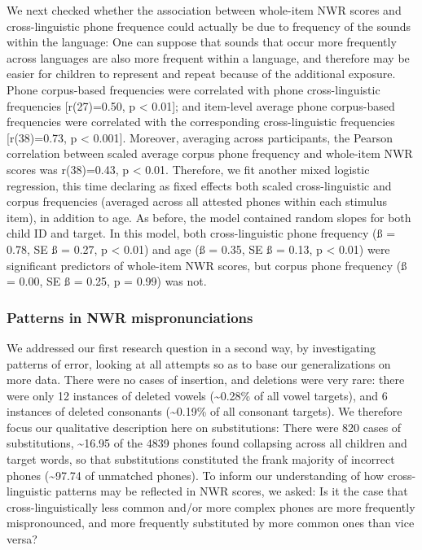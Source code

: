 \documentclass[english,,man,floatsintext]{apa6}
\begin{document}
We next checked whether the association between whole-item NWR scores and cross-linguistic phone frequence could actually be due to frequency of the sounds within the language: One can suppose that sounds that occur more frequently across languages are also more frequent within a language, and therefore may be easier for children to represent and repeat because of the additional exposure. Phone corpus-based frequencies were correlated with phone cross-linguistic frequencies {[}r(27)=0.50, p \textless{} 0.01{]}; and item-level average phone corpus-based frequencies were correlated with the corresponding cross-linguistic frequencies {[}r(38)=0.73, p \textless{} 0.001{]}. Moreover, averaging across participants, the Pearson correlation between scaled average corpus phone frequency and whole-item NWR scores was r(38)=0.43, p \textless{} 0.01. Therefore, we fit another mixed logistic regression, this time declaring as fixed effects both scaled cross-linguistic and corpus frequencies (averaged across all attested phones within each stimulus item), in addition to age. As before, the model contained random slopes for both child ID and target. In this model, both cross-linguistic phone frequency (ß = 0.78, SE ß = 0.27, p \textless{} 0.01) and age (ß = 0.35, SE ß = 0.13, p \textless{} 0.01) were significant predictors of whole-item NWR scores, but corpus phone frequency (ß = 0.00, SE ß = 0.25, p = 0.99) was not.

\hypertarget{patterns-in-nwr-mispronunciations}{%
\subsubsection{Patterns in NWR mispronunciations}\label{patterns-in-nwr-mispronunciations}}

We addressed our first research question in a second way, by investigating patterns of error, looking at all attempts so as to base our generalizations on more data. There were no cases of insertion, and deletions were very rare: there were only 12 instances of deleted vowels (\textasciitilde{}0.28\% of all vowel targets), and 6 instances of deleted consonants (\textasciitilde{}0.19\% of all consonant targets). We therefore focus our qualitative description here on substitutions: There were 820 cases of substitutions, \textasciitilde{}16.95 of the 4839 phones found collapsing across all children and target words, so that substitutions constituted the frank majority of incorrect phones (\textasciitilde{}97.74 of unmatched phones). To inform our understanding of how cross-linguistic patterns may be reflected in NWR scores, we asked: Is it the case that cross-linguistically less common and/or more complex phones are more frequently mispronounced, and more frequently substituted by more common ones than vice versa?
\end{document}
